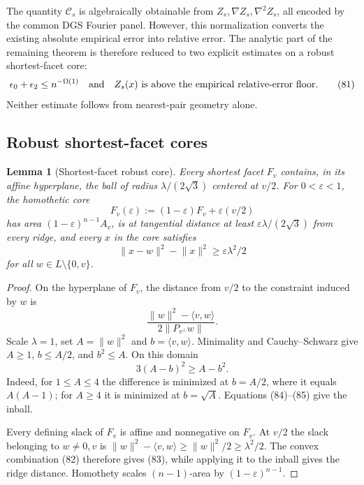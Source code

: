 \documentclass[10pt]{article}
\newtheorem{lemma}[theorem]{Lemma}
\theoremstyle{definition}
\newcommand{\ip}[2]{\langle #1,#2\rangle}
\newcommand{\norm}[1]{\lVert #1\rVert}
\begin{document}
The quantity $\mathcal C_s$ is algebraically obtainable from
$Z_s,\nabla Z_s,\nabla^2Z_s$, all encoded by the common DGS Fourier panel.
However, this normalization converts the existing absolute empirical error
into relative error.  The analytic part of the remaining theorem is
therefore reduced to two explicit estimates on a robust shortest-facet core:
\[
 \epsilon_0+\epsilon_2\le n^{-\Omega(1)}
 \quad\hbox{and}\quad
 Z_s(x)\ \hbox{is above the empirical relative-error floor}.   \tag{81}
\]
Neither estimate follows from nearest-pair geometry alone.

\subsection{Robust shortest-facet cores}

\begin{lemma}[Shortest-facet robust core]                       \label{lem:facet-core}
Every shortest facet $F_v$ contains, in its affine hyperplane, the ball of
radius $\lambda/(2\sqrt3)$ centered at $v/2$.  For $0<\varepsilon<1$, the
homothetic core
\[
 F_v(\varepsilon):=(1-\varepsilon)F_v+\varepsilon(v/2)          \tag{82}
\]
has area $(1-\varepsilon)^{n-1}A_v$, is at tangential distance at least
$\varepsilon\lambda/(2\sqrt3)$ from every ridge, and every $x$ in the core
satisfies
\[
 \norm{x-w}^2-\norm x^2\ge\varepsilon\lambda^2/2               \tag{83}
\]
for all $w\in L\setminus\{0,v\}$.
\end{lemma}

\begin{proof}
On the hyperplane of $F_v$, the distance from $v/2$ to the constraint
induced by $w$ is
\[
 \frac{\norm w^2-\ip{v}{w}}{2\norm{P_{v^\perp}w}}.             \tag{84}
\]
Scale $\lambda=1$, set $A=\norm w^2$ and $b=\ip{v}{w}$.  Minimality and
Cauchy--Schwarz give $A\ge1$, $b\le A/2$, and $b^2\le A$.  On this domain
\[
 3(A-b)^2\ge A-b^2.                                            \tag{85}
\]
Indeed, for $1\le A\le4$ the difference is minimized at $b=A/2$,
where it equals $A(A-1)$; for $A\ge4$ it is minimized at $b=\sqrt A$.
Equations (84)--(85) give the inball.

Every defining slack of $F_v$ is affine and nonnegative on $F_v$.  At $v/2$
the slack belonging to $w\ne0,v$ is
$\norm w^2-\ip{v}{w}\ge\norm w^2/2\ge\lambda^2/2$.  The convex
combination (82) therefore gives (83), while applying it to the inball gives
the ridge distance.  Homothety scales $(n-1)$-area by
$(1-\varepsilon)^{n-1}$.
\end{proof}
\end{document}
